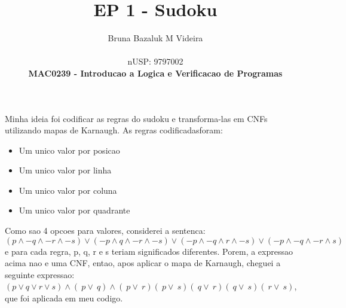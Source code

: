 \documentclass[12pt]{article}
\begin{document}
\title{\textbf{EP 1 - Sudoku}}%
\author{Bruna Bazaluk M Videira\\ %
\\ nUSP: 9797002
\\ \textbf{MAC0239 - Introducao a Logica e Verificacao de Programas}} %

\maketitle


\large{}

Minha ideia foi codificar as regras do sudoku e transforma-las em CNFs utilizando mapas de Karnaugh. As regras codificadasforam:
\begin{itemize}
\item Um unico valor por posicao
\item Um unico valor por linha
\item Um unico valor por coluna
\item Um unico valor por quadrante
\end{itemize}

Como sao 4 opcoes para valores, considerei a sentenca: $(p \wedge -q \wedge -r \wedge -s) \lor (-p \wedge q \wedge -r \wedge -s) \lor (-p \wedge -q \wedge r \wedge -s) \lor (-p \wedge -q \wedge -r \wedge s) $ e para cada regra, p, q, r e s teriam significados diferentes. Porem, a expressao acima nao e uma CNF, entao, apos aplicar o mapa de Karnaugh, cheguei a seguinte expressao: $ (p \lor q \lor r \lor s) \wedge (~p \lor ~q) \wedge  (~p \lor ~r)  (~p \lor ~s)  (~q \lor ~r)  (~q \lor ~s)  (~r \lor ~s)  $, que foi aplicada em meu codigo.
\end{document}
